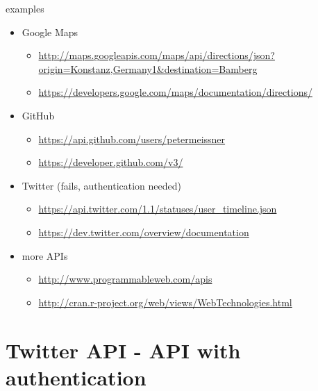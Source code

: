 \documentclass[ignorenonframetext,]{beamer}
\providecommand{\tightlist}{%
  \setlength{\itemsep}{0pt}\setlength{\parskip}{0pt}}
\begin{document}
\begin{frame}{examples}

\begin{itemize}
\tightlist
\item
  Google Maps

  \begin{itemize}
  \tightlist
  \item
    \url{http://maps.googleapis.com/maps/api/directions/json?origin=Konstanz,Germany1\&destination=Bamberg}
  \item
    \url{https://developers.google.com/maps/documentation/directions/}
  \end{itemize}
\item
  GitHub

  \begin{itemize}
  \tightlist
  \item
    \url{https://api.github.com/users/petermeissner}
  \item
    \url{https://developer.github.com/v3/}
  \end{itemize}
\item
  Twitter (fails, authentication needed)

  \begin{itemize}
  \tightlist
  \item
    \url{https://api.twitter.com/1.1/statuses/user_timeline.json}
  \item
    \href{https://api.twitter.com/1.1/statuses/user_timeline.json}{https://dev.twitter.com/overview/documentation}
  \end{itemize}
\item
  more APIs

  \begin{itemize}
  \tightlist
  \item
    \url{http://www.programmableweb.com/apis}
  \item
    \url{http://cran.r-project.org/web/views/WebTechnologies.html}
  \end{itemize}
\end{itemize}

\end{frame}

\section{Twitter API - API with
authentication}\label{twitter-api---api-with-authentication}
\end{document}
